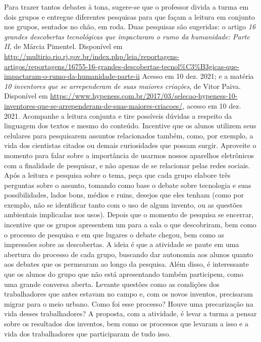 \documentclass[11pt]{extarticle}
\begin{document}
Para trazer tantos debates à tona, sugere-se que o professor divida a turma em dois grupos e entregue diferentes pesquisas para que façam a leitura em conjunto nos grupos, sentados no chão, em roda. Duas pesquisas são sugeridas: o artigo \textit{16 grandes descobertas tecnológicas que impactaram o rumo da humanidade: Parte II}, de Márcia Pimentel. Disponível em \url{http://multirio.rio.rj.gov.br/index.php/leia/reportagens-artigos/reportagens/16755-16-grandes-descobertas-tecnol%C3%B3gicas-que-impactaram-o-rumo-da-humanidade-parte-ii} Acesso em 10 dez. 2021; e a matéria \textit{10 inventores que se arrependeram de suas maiores criações}, de Vitor Paiva. Disponível em \url{https://www.hypeness.com.br/2017/03/selecao-hypeness-10-inventores-que-se-arrependeram-de-suas-maiores-criacoes/}, acesso em 10 dez. 2021. Acompanhe a leitura conjunta e tire possíveis dúvidas a respeito da linguagem dos textos e mesmo do conteúdo. Incentive que os alunos utilizem seus celulares para pesquisarem assuntos relacionados também, como, por exemplo, a vida dos cientistas citados ou demais curiosidades que possam surgir. Aproveite o momento para falar sobre a importância de usarmos nossos aparelhos eletrônicos com a finalidade de pesquisar, e não apenas de se relacionar pelas redes sociais. Após a leitura e pesquisa sobre o tema, peça que cada grupo elabore três perguntas sobre o assunto, tomando como base o debate sobre tecnologia e suas possibilidades, lados bons, médios e ruins, desejos que eles tenham (como por exemplo, não se identificar tanto com o uso de algum invento, ou as questões ambientais implicadas nos usos). Depois que o momento de pesquisa se encerrar, incentive que os grupos apresentem um para a sala o que descobriram, bem como o processo de pesquisa e em que lugares o debate chegou, bem como as impressões sobre as descobertas. A ideia é que a atividade se paute em uma abertura do processo de cada grupo, buscando dar autonomia aos alunos quanto aos debates que os permearam ao longo da pesquisa. Além disso, é interessante que os alunos do grupo que não está apresentando também participem, como uma grande conversa aberta. Levante questões como as condições dos trabalhadores que antes estavam no campo e, com os novos inventos, precisaram migrar para o meio urbano. Como foi esse processo? Houve uma precarização na vida desses trabalhadores? A proposta, com a atividade, é levar a turma a pensar sobre os resultados dos inventos, bem como os processos que levaram a isso e a vida dos trabalhadores que participaram de tudo isso. 
\end{document}
